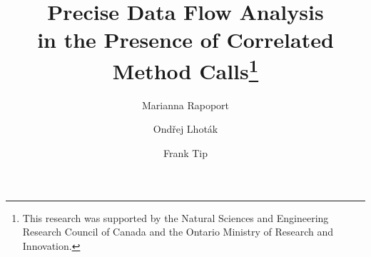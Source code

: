 \documentclass[runningheads,a4paper]{llncs}
\newcommand{\techreport}[1]{}
\begin{document}



\mainmatter  %

\title{Precise Data Flow Analysis\\in the Presence of Correlated Method Calls\footnote{This research was supported by the Natural Sciences and Engineering Research Council of Canada and the Ontario Ministry of Research and Innovation.}}
\techreport{\subtitle{David R. Cheriton School of Computer Science Technical Report CS-2015-07}}

\author{
 Marianna Rapoport \and
 Ond\v{r}ej Lhot\'ak \and
 Frank Tip
}



\maketitle






%
%



\vspace{.8cm}
\makeatletter
{}
\makeatother


\begingroup
\let\clearpage\relax

\endgroup

\techreport{\newpage}
\end{document}
